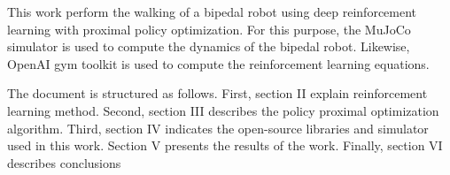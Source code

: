 This work perform the walking of a bipedal robot using deep reinforcement learning with proximal policy optimization. For this purpose, the MuJoCo simulator is used to compute the dynamics of the bipedal robot. Likewise, OpenAI gym toolkit is used to compute the reinforcement learning equations.

The document is structured as follows. First, section II explain reinforcement learning method. Second, section III describes the policy proximal optimization algorithm. Third, section IV indicates the open-source libraries and simulator used in this work. Section V presents the results of the work. Finally, section VI describes conclusions 


